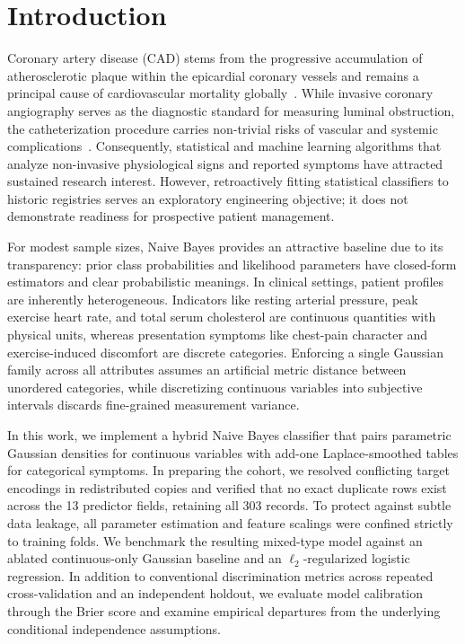 \documentclass[conference]{IEEEtran}
\begin{document}
\section{Introduction}
Coronary artery disease (CAD) stems from the progressive accumulation of atherosclerotic plaque within the epicardial coronary vessels and remains a principal cause of cardiovascular mortality globally~\cite{who2025}. While invasive coronary angiography serves as the diagnostic standard for measuring luminal obstruction, the catheterization procedure carries non-trivial risks of vascular and systemic complications~\cite{ahaCath}. Consequently, statistical and machine learning algorithms that analyze non-invasive physiological signs and reported symptoms have attracted sustained research interest. However, retroactively fitting statistical classifiers to historic registries serves an exploratory engineering objective; it does not demonstrate readiness for prospective patient management.

For modest sample sizes, Naive Bayes provides an attractive baseline due to its transparency: prior class probabilities and likelihood parameters have closed-form estimators and clear probabilistic meanings. In clinical settings, patient profiles are inherently heterogeneous. Indicators like resting arterial pressure, peak exercise heart rate, and total serum cholesterol are continuous quantities with physical units, whereas presentation symptoms like chest-pain character and exercise-induced discomfort are discrete categories. Enforcing a single Gaussian family across all attributes assumes an artificial metric distance between unordered categories, while discretizing continuous variables into subjective intervals discards fine-grained measurement variance.

In this work, we implement a hybrid Naive Bayes classifier that pairs parametric Gaussian densities for continuous variables with add-one Laplace-smoothed tables for categorical symptoms. In preparing the cohort, we resolved conflicting target encodings in redistributed copies and verified that no exact duplicate rows exist across the 13 predictor fields, retaining all 303 records. To protect against subtle data leakage, all parameter estimation and feature scalings were confined strictly to training folds. We benchmark the resulting mixed-type model against an ablated continuous-only Gaussian baseline and an $\ell_2$-regularized logistic regression. In addition to conventional discrimination metrics across repeated cross-validation and an independent holdout, we evaluate model calibration through the Brier score and examine empirical departures from the underlying conditional independence assumptions.
\end{document}
